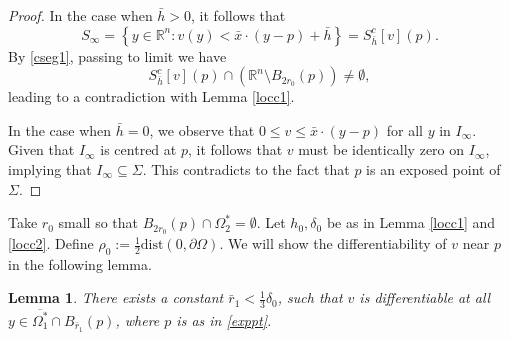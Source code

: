 \documentclass[11pt]{amsart}
\theoremstyle{plain}
\newtheorem{lemma}{Lemma}[section]
\newcommand{\0}{\textbf{0}}
\numberwithin{equation}{section}
\numberwithin{equation}{section}
\numberwithin{figure}{section}
\begin{document}
\begin{proof}
In the case when \( \bar{h} > 0 \), it follows that
\[
S_\infty = \left\{ y \in \mathbb{R}^n : v(y) < \bar{x} \cdot (y - p) + \bar{h} \right\} = S^c_{\bar{h}}[v](p).
\]
By \eqref{cseg1}, passing to limit we have
\[
S^c_{\bar{h}}[v](p) \cap \left( \mathbb{R}^n \setminus B_{2r_0}(p) \right) \neq \emptyset,
\]
leading to a contradiction with Lemma \ref{locc1}.

In the case when \( \bar{h} = 0 \), we observe that \( 0 \leq v \leq \bar{x} \cdot (y - p) \) for all \( y \) in \( I_\infty \). Given that \( I_\infty \) is centred at \( p \), it follows that \( v \) must be identically zero on \( I_\infty \), implying that \( I_\infty \subseteq \Sigma \). This contradicts to the fact that $p$ is an exposed point of $\Sigma$.
\end{proof}







Take $r_0$ small so that $B_{2r_0}(p)\cap \Omega_2^*=\emptyset$. Let $h_0, \delta_0$ be as in Lemma \ref{locc1} and \ref{locc2}. Define $\rho_0:=\frac{1}{2}\text{dist}(0,\partial \Omega)$. 
We will show the differentiability of $v$ near $p$ in the following lemma.
\begin{lemma}\label{c1lemma}
There exists a constant $\bar{r}_1<\frac{1}{3}\delta_0$, such that $v$ is differentiable at all $y\in \overline{\Omega_1^*}\cap B_{\bar{r}_1}(p)$, where $p$ is as in \eqref{exppt}. 
\end{lemma}
\end{document}
